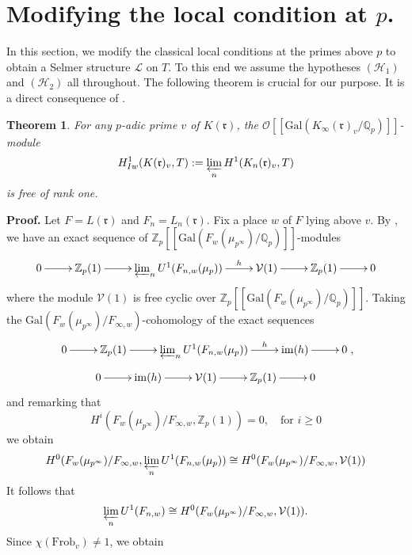 \documentclass[reqno]{amsart}
\newcounter{dummy} \numberwithin{dummy}{section}
\newtheorem{theo}[dummy]{Theorem }
\begin{document}
\section{\bf Modifying the local condition at $p$.}
In this section, we modify the classical local conditions at the
primes above $p$ to obtain a Selmer structure $\mathcal{L}$ on $T$.
To this end we assume  the hypotheses $(\mathcal{H}_{1})$ and
$(\mathcal{H}_{2})$ all throughout. The following theorem is crucial
for our purpose. It is a direct consequence of \cite[Theorem
2.2]{Greither96}.
\begin{theo}\label{Pro H1IW rank }
For any $p$-adic prime $v$ of $K(\mathfrak{r})$, the
$\mathcal{O}[[\mathrm{Gal}(K_{\infty}(\mathfrak{r})_{v}/\mathbb{Q}_{p})]]$-module
$$
H^{1}_{Iw}(K(\mathfrak{r})_{v},T):=\varprojlim_{n}
H^{1}(K_{n}(\mathfrak{r})_{v},T)
$$
is free of rank one.
\end{theo}
\noindent \textbf{Proof.} Let $F=L(\mathfrak{r})$ and
$F_{n}=L_{n}(\mathfrak{r})$. Fix a place $w$ of $F$ lying above $v$.
By \cite[Theorem 2.2]{Greither96}, we have an exact sequence of
$\mathbb{Z}_{p}[[\mathrm{Gal}(F_{w}(\mu_{p^{\infty}})/\mathbb{Q}_{p})]]$-modules
$$
\xymatrix@=2pc{ 0\ar[r]& \mathbb{Z}_{p}(1)\ar[r]& \varprojlim_{n}
U^{1}(F_{n,w}(\mu_{p}))\ar[r]^-{h}& \mathcal{V}(1)\ar[r]&
\mathbb{Z}_{p}(1)\ar[r]&0}
$$
where the module $\mathcal{V}(1)$ is free cyclic over
$\mathbb{Z}_{p}[[\mathrm{Gal}(F_{w}(\mu_{p^{\infty}})/\mathbb{Q}_{p})]]$.
Taking the
$\mathrm{Gal}(F_{w}(\mu_{p^{\infty}})/F_{\infty,w})$-cohomology of
the exact sequences
$$
\xymatrix@=2pc{ 0\ar[r]& \mathbb{Z}_{p}(1)\ar[r]& \varprojlim_{n}
U^{1}(F_{n,w}(\mu_{p}))\ar[r]^-{h}& \mathrm{im}(h)\ar[r]& 0},
$$
$$
\xymatrix@=2pc{ 0\ar[r]& \mathrm{im}(h)\ar[r]& \mathcal{V}(1)\ar[r]&
\mathbb{Z}_{p}(1)\ar[r]&0}
$$
and remarking that $$ H^{i}(F_{w}(\mu_{p^{\infty}})/F_{\infty,w},
\mathbb{Z}_{p}(1))=0, \quad \mbox{for $i\geq 0$}
$$
we obtain
$$
H^{0}(F_{w}(\mu_{p^{\infty}})/F_{\infty,w},
\varprojlim_{n}U^{1}(F_{n,w}(\mu_{p}))\cong
H^{0}(F_{w}(\mu_{p^{\infty}})/F_{\infty,w}, \mathcal{V}(1))
$$
It follows that
$$
 \varprojlim_{n}U^{1}(F_{n,w})\cong
H^{0}(F_{w}(\mu_{p^{\infty}})/F_{\infty,w}, \mathcal{V}(1)).
$$
Since $\chi(\mathrm{Frob}_{v})\neq 1$, we obtain
\end{document}
